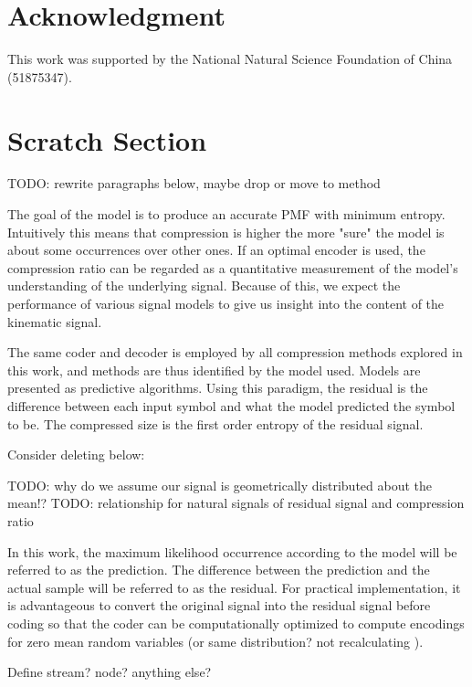 \documentclass[journal]{IEEEtran}
\begin{document}
\section*{Acknowledgment}
This work was supported by the National Natural Science
Foundation of China (51875347).

{}


\clearpage
\section*{Scratch Section}
TODO: rewrite paragraphs below, maybe drop or move to method

The goal of the model is to produce an accurate PMF with minimum entropy. Intuitively this means that compression is higher the more "sure" the model is about some occurrences over other ones. If an optimal encoder is used, the compression ratio can be regarded as a quantitative measurement of the model's understanding of the underlying signal. Because of this, we expect the performance of various signal models to give us insight into the content of the kinematic signal.

The same coder and decoder is employed by all compression methods explored in this work, and methods are thus identified by the model used. Models are presented as predictive algorithms. Using this paradigm, the residual is the difference between each input symbol and what the model predicted the symbol to be. The compressed size is the first order entropy of the residual signal.


Consider deleting below:

TODO: why do we assume our signal is geometrically distributed about the mean!?
TODO: relationship for natural signals of residual signal and compression ratio

In this work, the maximum likelihood occurrence according to the model will be referred to as the prediction. The difference between the prediction and the actual sample will be referred to as the residual. For practical implementation, it is advantageous to convert the original signal into the residual signal before coding so that the coder can be computationally optimized to compute encodings for zero mean random variables (or same distribution? not recalculating ).

Define stream? node? anything else?
\end{document}
